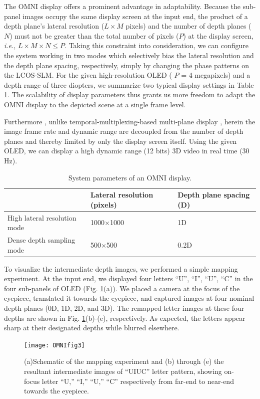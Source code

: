 \documentclass[9pt,twocolumn,twoside]{osajnl}
\begin{document}
The OMNI display offers a prominent advantage in adaptability. Because the sub-panel images occupy the same display screen at the input end, the product of a depth plane’s lateral resolution ($L\times M$ pixels) and the number of depth planes ($N$) must not be greater than the total number of pixels ($P$) at the display screen, \textit{i.e.},  $L\times M\times N\leq P$. Taking this constraint into consideration, we can configure the system working in two modes which selectively bias the lateral resolution and the depth plane spacing, respectively, simply by changing the phase patterns on the LCOS-SLM. For the given high-resolution OLED ( $P$ = 4 megapixels) and a depth range of three diopters, we summarize two typical display settings in Table \ref{table:1}. The scalability of display parameters thus grants us more freedom to adapt the OMNI display to the depicted scene at a single frame level. 

Furthermore  , unlike temporal-multiplexing-based multi-plane display \cite{hu2014design}, herein the image frame rate and dynamic range are decoupled from the number of depth planes and thereby limited by only the display screen itself. Using the given OLED, we can display a high dynamic range (12 bits) 3D video in real time (30 Hz).

\begin{table}[htbp]
\centering
\caption{System parameters of an OMNI display.}
\label{table:1}
\begin{tabular}{p{3.5cm}p{2cm}p{2cm}}
	\hline
	&Lateral resolution (pixels)&Depth plane spacing (D)\\
	\hline
	High lateral resolution mode&1000$\times$1000&1D\\
	Dense depth sampling mode&500$\times$500&0.2D\\
	\hline
\end{tabular}
\end{table}

To visualize the intermediate depth images, we performed a simple mapping experiment. At the input end, we displayed four letters “U”, “I”, “U”, “C” in the four sub-panels of OLED (Fig. \ref{fig:3}(a)). We placed a camera at the focus of the eyepiece, translated it towards the eyepiece, and captured images at four nominal depth planes (0D, 1D, 2D, and 3D).  The remapped letter images at these four depths are shown in Fig. \ref{fig:3}(b)-(e), respectively. As expected, the letters appear sharp at their designated depths while blurred elsewhere. 

\begin{figure}[htbp]
\centering
\texttt{[image: OMNIfig3]}
\caption{(a)Schematic of the mapping experiment and (b) through (e) the resultant intermediate images of “UIUC” letter pattern, showing on-focus letter “U,” “I,” “U,” “C” respectively from far-end to near-end towards the eyepiece.}
\label{fig:3}
\end{figure}
\end{document}
